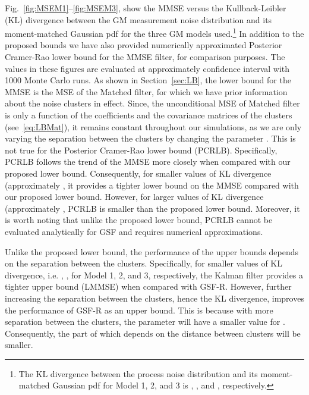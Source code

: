 \documentclass[10pt,twocolumn,twoside]{IEEEtran}
\newcommand{\corcol}[1]{\textcolor{CorCol}{#1}}
\begin{document}
Fig.~\ref{fig:MSEM1}--\ref{fig:MSEM3}, show the MMSE versus the Kullback-Leibler (KL) divergence between the GM measurement noise distribution and its moment-matched Gaussian pdf for the three GM models used.\footnote{The KL divergence between the process noise distribution and its moment-matched Gaussian pdf for Model 1, 2, and 3 is , , and , respectively.} \corcol{In addition to the proposed bounds we have also provided numerically approximated Posterior Cramer-Rao lower bound for the MMSE filter, for comparison purposes.} The values in these figures are evaluated at approximately  confidence interval with 1000 Monte Carlo runs. As shown in Section~\ref{sec:LB}, the lower bound for the MMSE is the MSE of the Matched filter, for which we have prior information about the noise clusters in effect. Since, the unconditional MSE of Matched filter is only a function of the coefficients and the covariance matrices of the clusters (see~\eqref{eq:LBMat}), it remains constant throughout our simulations, as we are only varying the separation between the clusters by changing the parameter . \corcol{This is not true for the Posterior Cramer-Rao lower bound (PCRLB). Specifically, PCRLB follows the trend of the MMSE more closely when compared with our proposed lower bound. Consequently, for smaller values of KL divergence (approximately , it provides a tighter lower bound on the MMSE compared with our proposed lower bound. However, for larger values of KL divergence (approximately , PCRLB is smaller than the proposed lower bound. Moreover, it is worth noting that unlike the proposed lower bound, PCRLB cannot be evaluated analytically for GSF and requires numerical approximations.} 

Unlike the proposed lower bound, the performance of the upper bounds depends on the separation between the clusters. Specifically, for smaller values of KL divergence, i.e. , ,  for Model 1, 2, and 3, respectively, \corcol{the }Kalman filter provides a tighter upper bound (LMMSE) when compared with GSF-R. However, further increasing the separation between the clusters, hence the KL divergence, improves the performance of GSF-R as an upper bound. This is because with more separation between the clusters, the parameter  will have a smaller value for . Consequently, the part of  which depends on the distance between clusters will be smaller.
\end{document}
